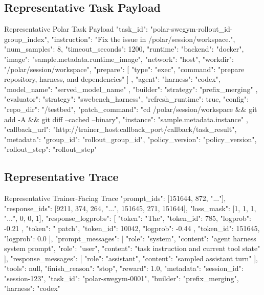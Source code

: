 \subsection{Representative Task Payload}
\label{app:task_payload}

\begin{polarlisting}{Representative Polar Task Payload}
{
  "task_id": "polar-swegym-{rollout_id}-{group_index}",
  "instruction": "Fix the issue in /polar/session/workspace.",
  "num_samples": 8,
  "timeout_seconds": 1200,
  "runtime": {
    "backend": "docker",
    "image": "{sample.metadata.runtime_image}",
    "network": "host",
    "workdir": "/polar/session/workspace",
    "prepare": [
      {
        "type": "exec",
        "command": "prepare repository, harness, and dependencies"
      }
    ]
  },
  "agent": {
    "harness": "codex",
    "model_name": "{served_model_name}"
  },
  "builder": {
    "strategy": "prefix_merging"
  },
  "evaluator": {
    "strategy": "swebench_harness",
    "refresh_runtime": true,
    "config": {
      "repo_dir": "/testbed",
      "patch_command": "cd /polar/session/workspace && git add -A && git diff --cached --binary",
      "instance": "{sample.metadata.instance}"
    }
  },
  "callback_url": "http://{trainer_host}:{callback_port}/callback/task_result",
  "metadata": {
    "group_id": "{rollout_group_id}",
    "policy_version": "{policy_version}",
    "rollout_step": "{rollout_step}"
  }
}
\end{polarlisting}

\subsection{Representative Trace}
\label{app:trace_example}

\begin{polarlisting}{Representative Trainer-Facing Trace}
{
  "prompt_ids": [151644, 872, "..."],
  "response_ids": [9211, 374, 264, "...", 151645, 271, 151644],
  "loss_mask": [1, 1, 1, "...", 0, 0, 1],
  "response_logprobs": [
    {
      "token": "The",
      "token_id": 785,
      "logprob": -0.21
    },
    {
      "token": " patch",
      "token_id": 10042,
      "logprob": -0.44
    },
    {
      "token_id": 151645,
      "logprob": 0.0
    }
  ],
  "prompt_messages": [
    {"role": "system", "content": "agent harness system prompt"},
    {"role": "user", "content": "task instruction and current tool state"}
  ],
  "response_messages": [
    {"role": "assistant", "content": "sampled assistant turn"}
  ],
  "tools": null,
  "finish_reason": "stop",
  "reward": 1.0,
  "metadata": {
    "session_id": "session-123",
    "task_id": "polar-swegym-0001",
    "builder": "prefix_merging",
    "harness": "codex"
  }
}
\end{polarlisting}

